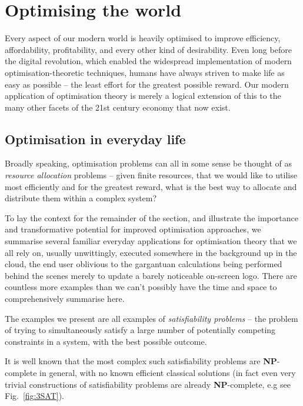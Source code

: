 %
%

\section{Optimising the world}\label{sec:optimising_the_world}

Every aspect of our modern world is heavily optimised to improve efficiency, affordability, profitability, and every other kind of desirability. Even long before the digital revolution, which enabled the widespread implementation of modern optimisation-theoretic techniques, humans have always striven to make life as easy as possible -- the least effort for the greatest possible reward. Our modern application of optimisation theory is merely a logical extension of this to the many other facets of the 21st century economy that now exist.

\subsection{Optimisation in everyday life}

Broadly speaking, optimisation problems can all in some sense be thought of as \textit{resource allocation} problems -- given finite resources, that we would like to utilise most efficiently and for the greatest reward, what is the best way to allocate and distribute them within a complex system?

To lay the context for the remainder of the section, and illustrate the importance and transformative potential for improved optimisation approaches, we summarise several familiar everyday applications for optimisation theory that we all rely on, usually unwittingly, executed somewhere in the background up in the cloud, the end user oblivious to the gargantuan calculations being performed behind the scenes merely to update a barely noticeable on-screen logo. There are countless more examples than we can't possibly have the time and space to comprehensively summarise here.

The examples we present are all examples of \textit{satisfiability problems} -- the problem of trying to simultaneously satisfy a large number of potentially competing constraints in a system, with the best possible outcome.

It is well known that the most complex such satisfiability problems are \textbf{NP}-complete in general, with no known efficient classical solutions (in fact even very trivial constructions of satisfiability problems are already \textbf{NP}-complete, e.g see Fig.~\ref{fig:3SAT}).

